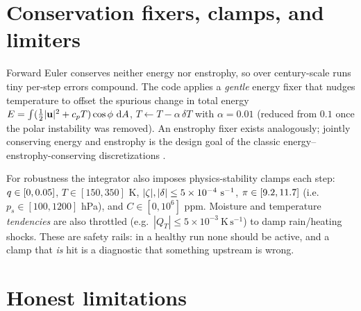 \section{Conservation fixers, clamps, and limiters}

Forward Euler conserves neither energy nor enstrophy, so over century-scale runs
tiny per-step errors compound. The code applies a \emph{gentle} energy fixer that
nudges temperature to offset the spurious change in total energy
$E=\int(\tfrac12|\mathbf{u}|^2+c_p T)\cos\phi\,\,\mathrm{d} A$,
$T \leftarrow T - \alpha\,\delta T$ with $\alpha=0.01$ (reduced from $0.1$ once the
polar instability was removed). An enstrophy fixer exists analogously; jointly
conserving energy and enstrophy is the design goal of the classic
energy--enstrophy-conserving discretizations \citep{arakawalamb1981}.

For robustness the integrator also imposes physics-stability clamps each step:
$q\in[0,0.05]$, $T\in[150,350]$ K, $|\zeta|,|\delta|\le 5\times10^{-4}\
\mathrm{s^{-1}}$, $\pi\in[9.2,11.7]$ (i.e.\ $p_s\in[100,1200]$ hPa), and
$C\in[0,10^6]$ ppm. Moisture and temperature \emph{tendencies} are also throttled
(e.g.\ $|Q_T|\le 5\times10^{-3}\ \mathrm{K\,s^{-1}}$) to damp rain/heating shocks.
These are safety rails: in a healthy run none should be active, and a clamp that
\emph{is} hit is a diagnostic that something upstream is wrong.

\section{Honest limitations}

